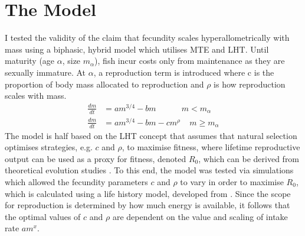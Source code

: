 \documentclass[a4paper]{article} %
\begin{document}
\section{The Model}\thispagestyle{empty}
I tested the validity of the claim that fecundity scales hyperallometrically with mass using a biphasic, hybrid model which utilises MTE and LHT. Until maturity (age $\alpha$, size $m_{\alpha}$), fish incur costs only from maintenance as they are sexually immature. At $\alpha$, a reproduction term is introduced where c is the proportion of body mass allocated to reproduction and $\rho$ is how reproduction scales with mass.
\begin{align*}
    \frac{dm}{dt} &= am^{3/4} - bm \ \ \ \ \ \ \ \ \ \ \ \ \ \ m < m_{\alpha} \\
    \frac{dm}{dt} &= am^{3/4} - bm - cm^{\rho} \ \ \ \ \ m \geq m_{\alpha}
\end{align*}
The model is half based on the LHT concept that assumes that natural selection optimises strategies, e.g. $c$ and $\rho$, to maximise fitness, where lifetime reproductive output can be used as a proxy for fitness, denoted $R_0$, which can be derived from theoretical evolution studies \autocite{Charnov2001, stearns1992evolution}. To this end, the model was tested via simulations which allowed the fecundity parameters $c$ and $\rho$ to vary in order to maximise $R_0$, which is calculated using a life history model, developed from \cite{Charnov2001}. Since the scope for reproduction is determined by how much energy is available, it follows that the optimal values of $c$ and $\rho$ are dependent on the value and scaling of intake rate $am^{x}$. 
\end{document}
